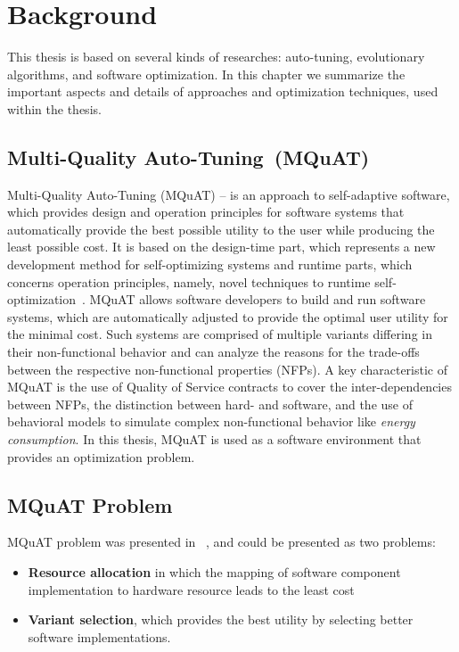\chapter{Background}
This thesis is based on several kinds of researches: auto-tuning, evolutionary algorithms, and software optimization. In this chapter we summarize the important aspects and details of approaches and optimization techniques, used within the thesis.  

\section{Multi-Quality Auto-Tuning~(MQuAT)}

Multi-Quality Auto-Tuning (MQuAT) – is an approach to self-adaptive software, which provides design and operation principles for software systems that automatically provide the best possible utility to the user while producing the least possible cost.
It is based on the design-time part, which represents a new development method for self-optimizing systems and runtime parts, which concerns operation principles, namely,  novel techniques to runtime self-optimization~\cite{gotz13}.
MQuAT allows software developers to build and run software systems, which are automatically adjusted to provide the optimal user utility for the minimal cost. Such systems are comprised of multiple variants differing in their non-functional behavior and can analyze the reasons for the trade-offs between the respective non-functional properties (NFPs).  A key characteristic of MQuAT is the use of Quality of Service contracts to cover the inter-dependencies between NFPs,  the distinction between hard- and software, and the use of behavioral models to simulate complex non-functional behavior like \textit{energy consumption}.
In this thesis, MQuAT is used as a software environment that provides an optimization problem.


\section{MQuAT Problem}
\label{sec:MQuATProblem}

MQuAT problem was presented in ~\cite{gotz18}, and could be presented as two problems:

\begin{itemize}
	\item \textbf{Resource allocation} in which the mapping of software component implementation to hardware resource leads to the least cost
	\item \textbf{Variant selection}, which provides the best utility by selecting better software implementations.
\end{itemize} 

